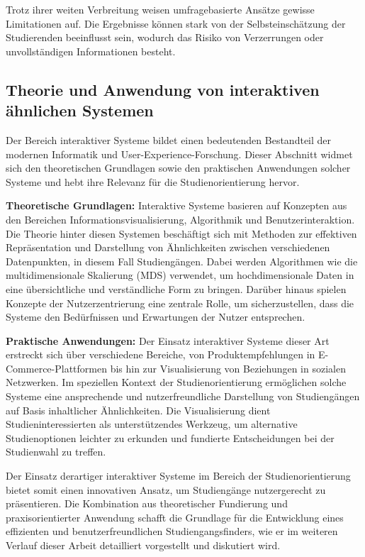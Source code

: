 Trotz ihrer weiten Verbreitung weisen umfragebasierte Ansätze gewisse
Limitationen auf. Die Ergebnisse können stark von der Selbsteinschätzung der
Studierenden beeinflusst sein, wodurch das Risiko von Verzerrungen oder
unvollständigen Informationen besteht.

\subsection{Theorie und Anwendung von interaktiven ähnlichen Systemen}
Der Bereich interaktiver Systeme bildet einen bedeutenden Bestandteil der modernen Informatik und User-Experience-Forschung. Dieser Abschnitt widmet sich den theoretischen Grundlagen sowie den praktischen Anwendungen solcher Systeme und hebt ihre Relevanz für die Studienorientierung hervor. \parencite{interaktive-systeme}

\textbf{Theoretische Grundlagen:}
Interaktive Systeme basieren auf Konzepten aus den Bereichen
Informationsvisualisierung, Algorithmik und Benutzerinteraktion. Die Theorie
hinter diesen Systemen beschäftigt sich mit Methoden zur effektiven
Repräsentation und Darstellung von Ähnlichkeiten zwischen verschiedenen
Datenpunkten, in diesem Fall Studiengängen. Dabei werden Algorithmen wie die
multidimensionale Skalierung (MDS) verwendet, um hochdimensionale Daten in eine
übersichtliche und verständliche Form zu bringen. Darüber hinaus spielen
Konzepte der Nutzerzentrierung eine zentrale Rolle, um sicherzustellen, dass die
Systeme den Bedürfnissen und Erwartungen der Nutzer entsprechen.

\textbf{Praktische Anwendungen:}
Der Einsatz interaktiver Systeme dieser Art erstreckt sich über verschiedene
Bereiche, von Produktempfehlungen in E-Commerce-Plattformen bis hin zur
Visualisierung von Beziehungen in sozialen Netzwerken. Im speziellen Kontext der Studienorientierung ermöglichen solche Systeme eine ansprechende und nutzerfreundliche Darstellung von Studiengängen auf Basis inhaltlicher Ähnlichkeiten. Die Visualisierung dient Studieninteressierten als unterstützendes Werkzeug, um alternative Studienoptionen leichter zu erkunden und fundierte Entscheidungen bei der Studienwahl zu treffen.

Der Einsatz derartiger interaktiver Systeme im Bereich der Studienorientierung bietet somit einen innovativen Ansatz, um Studiengänge nutzergerecht zu präsentieren. Die Kombination aus theoretischer Fundierung und praxisorientierter Anwendung schafft die Grundlage für die Entwicklung eines effizienten und benutzerfreundlichen Studiengangsfinders, wie er im weiteren Verlauf dieser Arbeit detailliert
vorgestellt und diskutiert wird.